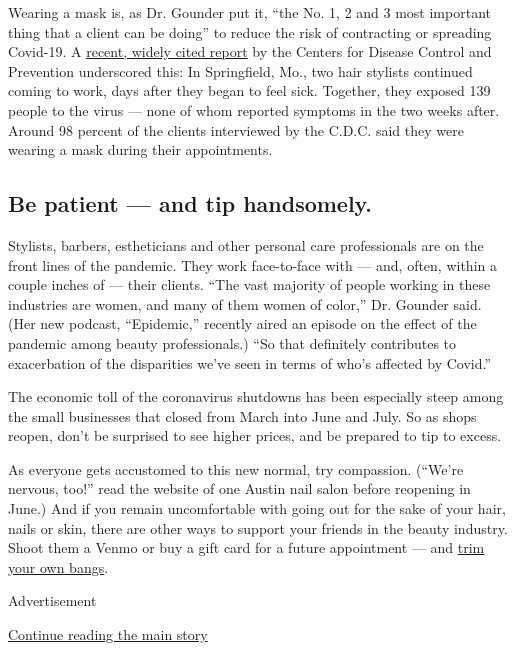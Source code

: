 Wearing a mask is, as Dr. Gounder put it, ``the No. 1, 2 and 3 most
important thing that a client can be doing'' to reduce the risk of
contracting or spreading Covid-19. A
\href{https://www.cdc.gov/mmwr/volumes/69/wr/mm6928e2.htm}{recent,
widely cited report} by the Centers for Disease Control and Prevention
underscored this: In Springfield, Mo., two hair stylists continued
coming to work, days after they began to feel sick. Together, they
exposed 139 people to the virus --- none of whom reported symptoms in
the two weeks after. Around 98 percent of the clients interviewed by the
C.D.C. said they were wearing a mask during their appointments.

\hypertarget{be-patient--and-tip-handsomely}{%
\subsection{Be patient --- and tip
handsomely.}\label{be-patient--and-tip-handsomely}}

Stylists, barbers, estheticians and other personal care professionals
are on the front lines of the pandemic. They work face-to-face with ---
and, often, within a couple inches of --- their clients. ``The vast
majority of people working in these industries are women, and many of
them women of color,'' Dr. Gounder said. (Her new podcast, ``Epidemic,''
recently aired an episode on the effect of the pandemic among beauty
professionals.) ``So that definitely contributes to exacerbation of the
disparities we've seen in terms of who's affected by Covid.''

The economic toll of the coronavirus shutdowns has been especially steep
among the small businesses that closed from March into June and July. So
as shops reopen, don't be surprised to see higher prices, and be
prepared to tip to excess.

As everyone gets accustomed to this new normal, try compassion. (``We're
nervous, too!'' read the website of one Austin nail salon before
reopening in June.) And if you remain uncomfortable with going out for
the sake of your hair, nails or skin, there are other ways to support
your friends in the beauty industry. Shoot them a Venmo or buy a gift
card for a future appointment --- and
\href{https://www.nytimes.com/2020/04/23/style/self-care/quarantine-cut-your-own-bangs-coronavirus.html}{trim
your own bangs}.

Advertisement

\protect\hyperlink{after-bottom}{Continue reading the main story}

